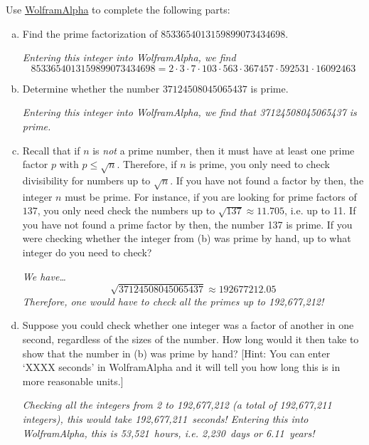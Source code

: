 \documentclass[11pt,letterpaper]{article}
\begin{document}
 Use \href{https://www.wolframalpha.com/}{WolframAlpha} to complete the following parts: 
\begin{enumerate}[(a)]
\item Find the prime factorization of $8533654013159899073434698$. \pspace

{\itshape Entering this integer into WolframAlpha, we find
	\[
	8533654013159899073434698= 2 \cdot 3 \cdot 7 \cdot 103 \cdot 563 \cdot 367457 \cdot 592531 \cdot 16092463
	\]
} \pvspace{0.8cm}


\item Determine whether the number $37124508045065437$ is prime. \pspace

{\itshape Entering this integer into WolframAlpha, we find that 37124508045065437 is prime.} \pvspace{2.5cm}


\item Recall that if $n$ is \textit{not} a prime number, then it must have at least one prime factor $p$ with $p \leq \sqrt{n}$. Therefore, if $n$ is prime, you only need to check divisibility for numbers up to $\sqrt{n}$. If you have not found a factor by then, the integer $n$ must be prime. For instance, if you are looking for prime factors of $137$, you only need check the numbers up to $\sqrt{137} \approx 11.705$, i.e. up to 11. If you have not found a prime factor by then, the number 137 is prime. If you were checking whether the integer from (b) was prime by hand, up to what integer do you need to check? \pspace

{\itshape We have\dots
	\[
	\sqrt{37124508045065437} \approx 192677212.05 
	\]
Therefore, one would have to check all the primes up to 192,677,212!
} \pvspace{1.3cm}


\item  Suppose you could check whether one integer was a factor of another in one second, regardless of the sizes of the number. How long would it then take to show that the number in (b) was prime by hand? [Hint: You can enter `XXXX seconds' in WolframAlpha and it will tell you how long this is in more reasonable units.] \pspace

{\itshape Checking all the integers from 2 to 192,677,212 (a total of 192,677,211 integers), this would take 192,677,211~seconds! Entering this into WolframAlpha, this is 53,521~hours, i.e. 2,230~days or 6.11~years!}
\end{enumerate} \vfill


\end{document}
